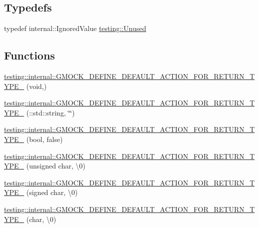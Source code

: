 \subsection*{Typedefs}
\begin{DoxyCompactItemize}
\item 
typedef internal\+::\+Ignored\+Value \mbox{\hyperlink{namespacetesting_a603e329ec0263ebfcf16f712810bd511}{testing\+::\+Unused}}
\end{DoxyCompactItemize}
\subsection*{Functions}
\begin{DoxyCompactItemize}
\item 
\mbox{\hyperlink{namespacetesting_1_1internal_a8fe6f7c11d6d3dd6e42b75c9a5b43861}{testing\+::internal\+::\+G\+M\+O\+C\+K\+\_\+\+D\+E\+F\+I\+N\+E\+\_\+\+D\+E\+F\+A\+U\+L\+T\+\_\+\+A\+C\+T\+I\+O\+N\+\_\+\+F\+O\+R\+\_\+\+R\+E\+T\+U\+R\+N\+\_\+\+T\+Y\+P\+E\+\_\+}} (void,)
\item 
\mbox{\hyperlink{namespacetesting_1_1internal_a0a961f38f341d40237252babcb3767b7}{testing\+::internal\+::\+G\+M\+O\+C\+K\+\_\+\+D\+E\+F\+I\+N\+E\+\_\+\+D\+E\+F\+A\+U\+L\+T\+\_\+\+A\+C\+T\+I\+O\+N\+\_\+\+F\+O\+R\+\_\+\+R\+E\+T\+U\+R\+N\+\_\+\+T\+Y\+P\+E\+\_\+}} (\+::std\+::string, \char`\"{}\char`\"{})
\item 
\mbox{\hyperlink{namespacetesting_1_1internal_aa6670915f42119e4ba20d8cb74fc1eea}{testing\+::internal\+::\+G\+M\+O\+C\+K\+\_\+\+D\+E\+F\+I\+N\+E\+\_\+\+D\+E\+F\+A\+U\+L\+T\+\_\+\+A\+C\+T\+I\+O\+N\+\_\+\+F\+O\+R\+\_\+\+R\+E\+T\+U\+R\+N\+\_\+\+T\+Y\+P\+E\+\_\+}} (bool, false)
\item 
\mbox{\hyperlink{namespacetesting_1_1internal_ab203e2c4c54f2ca86439344347a3e43f}{testing\+::internal\+::\+G\+M\+O\+C\+K\+\_\+\+D\+E\+F\+I\+N\+E\+\_\+\+D\+E\+F\+A\+U\+L\+T\+\_\+\+A\+C\+T\+I\+O\+N\+\_\+\+F\+O\+R\+\_\+\+R\+E\+T\+U\+R\+N\+\_\+\+T\+Y\+P\+E\+\_\+}} (unsigned char, \textquotesingle{}\textbackslash{}0\textquotesingle{})
\item 
\mbox{\hyperlink{namespacetesting_1_1internal_aaedb3b1b5307625bc84dc660742da3c6}{testing\+::internal\+::\+G\+M\+O\+C\+K\+\_\+\+D\+E\+F\+I\+N\+E\+\_\+\+D\+E\+F\+A\+U\+L\+T\+\_\+\+A\+C\+T\+I\+O\+N\+\_\+\+F\+O\+R\+\_\+\+R\+E\+T\+U\+R\+N\+\_\+\+T\+Y\+P\+E\+\_\+}} (signed char, \textquotesingle{}\textbackslash{}0\textquotesingle{})
\item 
\mbox{\hyperlink{namespacetesting_1_1internal_aeaaa7101572f283fe70a85ad5e6c65dc}{testing\+::internal\+::\+G\+M\+O\+C\+K\+\_\+\+D\+E\+F\+I\+N\+E\+\_\+\+D\+E\+F\+A\+U\+L\+T\+\_\+\+A\+C\+T\+I\+O\+N\+\_\+\+F\+O\+R\+\_\+\+R\+E\+T\+U\+R\+N\+\_\+\+T\+Y\+P\+E\+\_\+}} (char, \textquotesingle{}\textbackslash{}0\textquotesingle{})

\end{DoxyCompactItemize}

